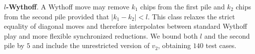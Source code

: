 \documentclass[review]{elsarticle}
\newcommand{\set}[1]{\{ #1 \}}
\newcommand{\tuple}[1]{\langle {#1} \rangle}
\newcommand{\true}{\top}
\newcommand{\statevar}{\mathcal{X}}
\newcommand{\act}{\mathcal{A}}
\newcommand{\constraint}{\mathcal{C}}
\newcommand{\estate}{\mathcal{E}}
\newcommand{\pre}{\mathtt{pre}}
\newcommand{\eff}{\mathtt{eff}}
\begin{document}
{\color{red}\textbf{$l$-Wythoff}. A Wythoff move may remove $k_1$ chips from the first pile and $k_2$ chips from the second pile provided that $|k_1-k_2|<l$.}
{\color{red}This class relaxes the strict equality of diagonal moves and therefore interpolates between standard Wythoff play and more flexible synchronized reductions.}
{\color{red}We bound both $l$ and the second pile by $5$ and include the unrestricted version of $v_2$, obtaining $140$ test cases.}
\end{document}
